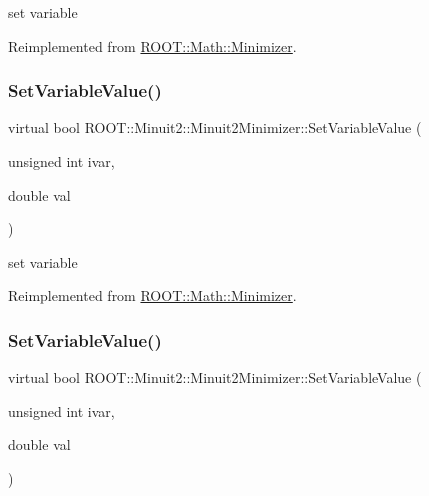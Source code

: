 set variable 



Reimplemented from \mbox{\hyperlink{classROOT_1_1Math_1_1Minimizer_a47e9a16c7a0b4ecfe769ee4be048d5c3}{R\+O\+O\+T\+::\+Math\+::\+Minimizer}}.

\mbox{\label{classROOT_1_1Minuit2_1_1Minuit2Minimizer_a474e05b30c1227e9cc39fb597027f426}} 
\subsubsection{\texorpdfstring{SetVariableValue()}{SetVariableValue()}\hspace{0.1cm}{\footnotesize\ttfamily [2/3]}}
{\footnotesize\ttfamily virtual bool R\+O\+O\+T\+::\+Minuit2\+::\+Minuit2\+Minimizer\+::\+Set\+Variable\+Value (\begin{DoxyParamCaption}\item[{unsigned int}]{ivar,  }\item[{double}]{val }\end{DoxyParamCaption})\hspace{0.3cm}{\ttfamily [virtual]}}



set variable 



Reimplemented from \mbox{\hyperlink{classROOT_1_1Math_1_1Minimizer_a47e9a16c7a0b4ecfe769ee4be048d5c3}{R\+O\+O\+T\+::\+Math\+::\+Minimizer}}.

\mbox{\label{classROOT_1_1Minuit2_1_1Minuit2Minimizer_a474e05b30c1227e9cc39fb597027f426}} 
\subsubsection{\texorpdfstring{SetVariableValue()}{SetVariableValue()}\hspace{0.1cm}{\footnotesize\ttfamily [3/3]}}
{\footnotesize\ttfamily virtual bool R\+O\+O\+T\+::\+Minuit2\+::\+Minuit2\+Minimizer\+::\+Set\+Variable\+Value (\begin{DoxyParamCaption}\item[{unsigned int}]{ivar,  }\item[{double}]{val }\end{DoxyParamCaption})\hspace{0.3cm}{\ttfamily [virtual]}}



